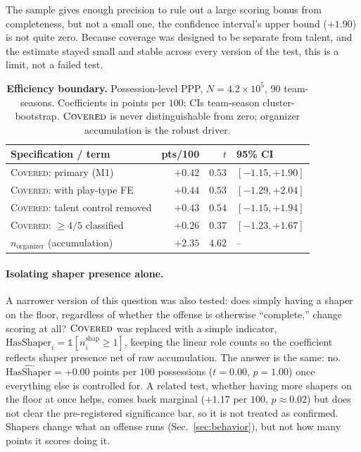 \documentclass[11pt]{article}
\begin{document}
The sample gives enough precision to rule out a large scoring bonus from completeness, but
not a small one, the confidence interval's upper bound ($+1.90$) is not quite zero. Because
coverage was designed to be separate from talent, and the estimate stayed small and stable
across every version of the test, this is a limit, not a failed test.

\begin{table}[t]
\centering\small
\caption{\textbf{Efficiency boundary.} Possession-level PPP, $N\!=\!4.2\times10^{5}$, $90$ team-seasons.
Coefficients in points per $100$; CIs team-season cluster-bootstrap. $\textsc{Covered}$ is never
distinguishable from zero; organizer accumulation is the robust driver.}
\label{tab:coverage}
\begin{tabular}{lrrl}
\toprule
Specification / term & pts/100 & $t$ & 95\% CI \\
\midrule
\textsc{Covered}: primary (M1) & $+0.42$ & $0.53$ & $[-1.15,+1.90]$ \\
\textsc{Covered}: with play-type FE & $+0.44$ & $0.53$ & $[-1.29,+2.04]$ \\
\textsc{Covered}: talent control removed & $+0.43$ & $0.54$ & $[-1.15,+1.94]$ \\
\textsc{Covered}: $\ge 4/5$ classified & $+0.26$ & $0.37$ & $[-1.23,+1.67]$ \\
\midrule
$n_{\text{organizer}}$ (accumulation) & $+2.35$ & $4.62$ & -- \\
\bottomrule
\end{tabular}
\end{table}

\paragraph{Isolating shaper presence alone.}
A narrower version of this question was also tested: does simply having a shaper on the
floor, regardless of whether the offense is otherwise ``complete,'' change scoring at all?
$\textsc{Covered}$ was replaced with a simple indicator,
$\text{HasShaper}_i=\mathbb{1}[n^{\text{shap}}_i\ge1]$, keeping the linear role counts so
the coefficient reflects shaper presence net of raw accumulation. The answer is the same:
no. $\widehat{\text{HasShaper}}=+0.00$ points per $100$ possessions ($t=0.00$, $p=1.00$)
once everything else is controlled for. A related test, whether having more shapers on the
floor at once helps, comes back marginal ($+1.17$ per $100$, $p\approx0.02$) but does not
clear the pre-registered significance bar, so it is not treated as confirmed. Shapers change
what an offense runs (Sec.~\ref{sec:behavior}), but not how many points it scores doing it.
\end{document}
